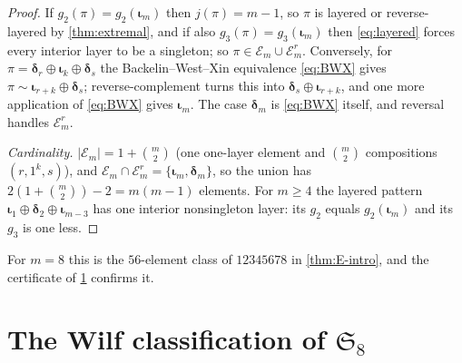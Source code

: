 \documentclass[11pt,reqno]{amsart}
\theoremstyle{plain}
\theoremstyle{definition}
\theoremstyle{remark}
\let\greekiota\iota
\renewcommand{\iota}{\boldsymbol{\greekiota}}
\newcommand{\dd}{\boldsymbol{\delta}}
\newcommand{\Sym}{\mathfrak{S}}
\begin{document}
\begin{proof}
If $g_2(\pi)=g_2(\iota_m)$ then $j(\pi)=m-1$, so $\pi$ is layered or reverse-layered by \cref{thm:extremal}, and if also $g_3(\pi)=g_3(\iota_m)$ then \eqref{eq:layered} forces every interior layer to be a singleton; so $\pi\in\mathcal E_m\cup\mathcal E_m^r$. Conversely, for $\pi=\dd_r\oplus\iota_k\oplus\dd_s$ the Backelin--West--Xin equivalence \eqref{eq:BWX} gives $\pi\sim\iota_{r+k}\oplus\dd_s$; reverse-complement turns this into $\dd_s\oplus\iota_{r+k}$, and one more application of \eqref{eq:BWX} gives $\iota_m$. The case $\dd_m$ is \eqref{eq:BWX} itself, and reversal handles $\mathcal E_m^r$. 

\emph{Cardinality.} $|\mathcal E_m|=1+\binom m2$ (one one-layer element and $\binom m2$ compositions $(r,1^k,s)$), and $\mathcal E_m\cap\mathcal E_m^r=\{\iota_m,\dd_m\}$, so the union has $2(1+\binom m2)-2=m(m-1)$ elements. For $m\ge4$ the layered pattern $\iota_1\oplus\dd_2\oplus\iota_{m-3}$ has one interior nonsingleton layer: its $g_2$ equals $g_2(\iota_m)$ and its $g_3$ is one less.
\end{proof}

For $m=8$ this is the $56$-element class of $12345678$ in \cref{thm:E-intro}, and the certificate of \cref{sec:S8} confirms it.

\section{The Wilf classification of \texorpdfstring{$\Sym_8$}{S8}}\label{sec:S8}
\end{document}
